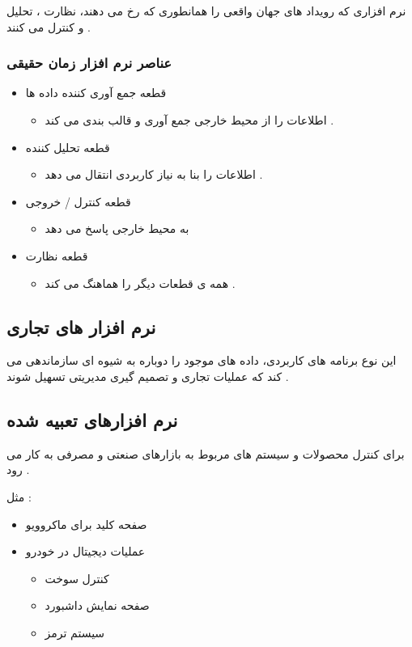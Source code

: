 \documentclass{article}
\begin{document}
نرم افزاری که رویداد های جهان واقعی را همانطوری که رخ می دهند، نظارت ، تحلیل و کنترل می کنند .

\subsubsection{عناصر نرم افزار زمان حقیقی}

\begin{itemize}
	\item قطعه جمع آوری کننده داده ها
	\begin{itemize}
		\item اطلاعات را از محیط خارجی جمع آوری و قالب بندی می کند .
	\end{itemize}
	\item قطعه تحلیل کننده
	\begin{itemize}
		\item اطلاعات را بنا به نیاز کاربردی انتقال می دهد .
	\end{itemize}
	\item قطعه کنترل / خروجی
	\begin{itemize}
		\item به محیط خارجی پاسخ می دهد
	\end{itemize}
	\item قطعه نظارت
	\begin{itemize}
		\item همه ی قطعات دیگر را هماهنگ می کند .
	\end{itemize}
\end{itemize}



\subsection{نرم افزار های تجاری}
این نوع برنامه های کاربردی، داده های موجود را دوباره به شیوه ای سازماندهی می کند که عملیات تجاری و تصمیم گیری مدیریتی تسهیل شوند .


\subsection{نرم افزارهای تعبیه شده}
برای کنترل محصولات و سیستم های مربوط به بازارهای صنعتی و مصرفی به کار می رود .

مثل : 

\begin{itemize}
	\item صفحه کلید برای ماکروویو
	\item عملیات دیجیتال در خودرو
	\begin{itemize}
		\item کنترل سوخت
		\item صفحه نمایش داشبورد
		\item سیستم ترمز
	\end{itemize}
\end{itemize}
\end{document}
